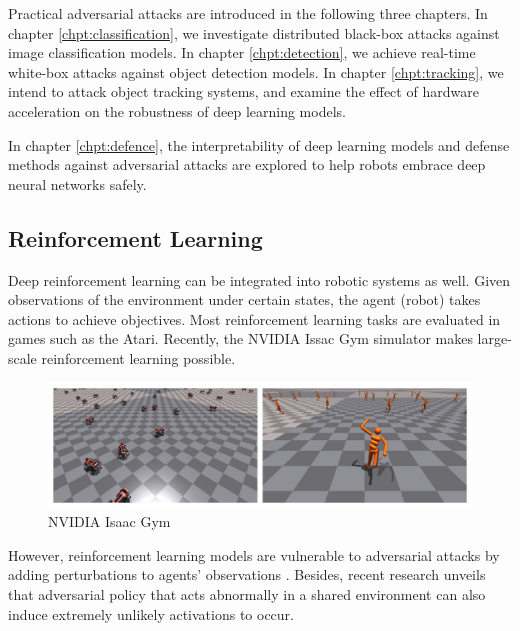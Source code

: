 Practical adversarial attacks are introduced in the following three chapters. In chapter \ref{chpt:classification}, we investigate distributed black-box attacks against image classification models. In chapter \ref{chpt:detection}, we achieve real-time white-box attacks against object detection models. In chapter \ref{chpt:tracking}, we intend to attack object tracking systems, and examine the effect of hardware acceleration on the robustness of deep learning models. 


In chapter \ref{chpt:defence}, the interpretability of deep learning models and defense methods against adversarial attacks are explored to help robots embrace deep neural networks safely.


\subsection{Reinforcement Learning}
\label{sec:reinf_robot}

Deep reinforcement learning can be integrated into robotic systems as well. Given observations of the environment under certain states, the agent (robot) takes actions to achieve objectives. Most reinforcement learning tasks are evaluated in games such as the Atari. Recently, the NVIDIA Issac Gym simulator makes large-scale reinforcement learning possible.

\begin{figure}[H]
\centering
\includegraphics[width=\textwidth]{figures/chapter_intro/issac_gym.jpg}
\caption{NVIDIA Isaac Gym}
\label{fig.issac_gym}
\end{figure}

However, reinforcement learning models are vulnerable to adversarial attacks by adding perturbations to agents' observations \cite{chen2019adversarial}. Besides, recent research unveils that adversarial policy that acts abnormally in a shared environment can also induce extremely unlikely activations to occur.


